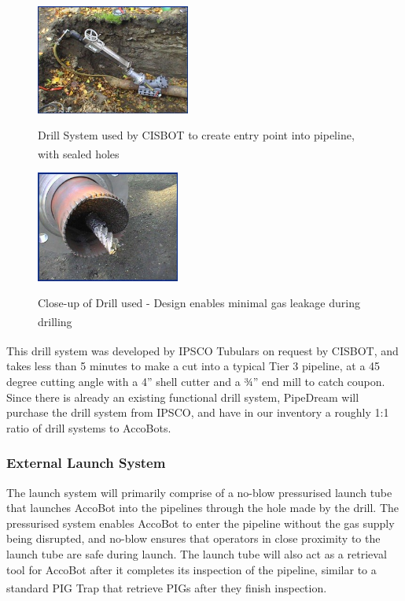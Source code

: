 \documentclass[11pt]{article}		%
\newcommand{\supercite}[1]{\textsuperscript{\cite{#1}}}		%
\begin{document}
				\begin{figure}[h]
				\centering
				\begin{multicols}{2}
				    \includegraphics[width = 0.45\textwidth]{drill1.jpg}
    				\caption{Drill System used by CISBOT to create entry point into pipeline, with sealed holes\supercite{drill1} }
    				\label{drill1}
    				\columnbreak
    				\includegraphics[width = 0.42\textwidth]{drill2.jpg}
    				\caption{Close-up of Drill used - Design enables minimal gas leakage during drilling\supercite{drill2}}
    				\label{drill2}
				\end{multicols}
			\end{figure}
		This drill system was developed by IPSCO Tubulars on request by CISBOT\supercite{ipsco}, and takes less than 5 minutes to make a cut into a typical Tier 3 pipeline, at a 45 degree cutting angle with a 4” shell cutter and a ¾” end mill to catch coupon.
        \\ \hspace*{3ex}Since there is already an existing functional drill system, PipeDream will purchase the drill system from IPSCO, and have in our inventory a roughly 1:1 ratio of drill systems to AccoBots. 
		\subsubsection{External Launch System}
	    The launch system will primarily comprise of a no-blow pressurised launch tube that launches AccoBot into the pipelines through the hole made by the drill. The pressurised system enables AccoBot to enter the pipeline without the gas supply being disrupted, and no-blow ensures that operators in close proximity to the launch tube are safe during launch. The launch tube will also act as a retrieval tool for AccoBot after it completes its inspection of the pipeline, similar to a standard PIG Trap that retrieve PIGs after they finish inspection\supercite{pigtrap}. 
\end{document}
